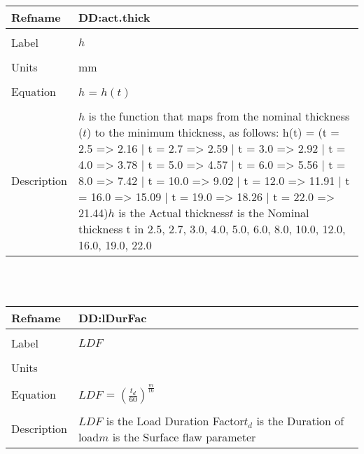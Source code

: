 \documentclass[12pt]{article}
\begin{document}
\noindent \begin{minipage}{\textwidth}
\begin{tabular}{p{} p{}}
\toprule \textbf{Refname} & \textbf{DD:act.thick}
\label{DD:act.thick}
\\ \midrule \\
Label & $h$
\\ \midrule \\
Units & mm
\\ \midrule \\
Equation & $h$ = $h(t)$
\\ \midrule \\
Description & $h$ is the  function that maps from the nominal thickness ($t$) to the minimum thickness, as follows: h(t) = (t = 2.5 => 2.16 | t = 2.7 => 2.59 | t = 3.0 => 2.92 | t = 4.0 => 3.78 | t = 5.0 => 4.57 | t = 6.0 => 5.56 | t = 8.0 => 7.42 | t = 10.0 => 9.02 | t = 12.0 => 11.91 | t = 16.0 => 15.09 | t = 19.0 => 18.26 | t = 22.0 => 21.44)\newline$h$ is the Actual thickness\newline$t$ is the Nominal thickness t in {2.5, 2.7, 3.0, 4.0, 5.0, 6.0, 8.0, 10.0, 12.0, 16.0, 19.0, 22.0}
\\ \bottomrule \end{tabular}
\end{minipage}\\
~\newline
\noindent \begin{minipage}{\textwidth}
\begin{tabular}{p{} p{}}
\toprule \textbf{Refname} & \textbf{DD:lDurFac}
\label{DD:lDurFac}
\\ \midrule \\
Label & $LDF$
\\ \midrule \\
Units & 
\\ \midrule \\
Equation & $LDF$ = $(\frac{t_{d}}{60})^{\frac{m}{16}}$
\\ \midrule \\
Description & $LDF$ is the Load Duration Factor\newline$t_{d}$ is the Duration of load\newline$m$ is the Surface flaw parameter
\\ \bottomrule \end{tabular}
\end{minipage}\\
\end{document}

